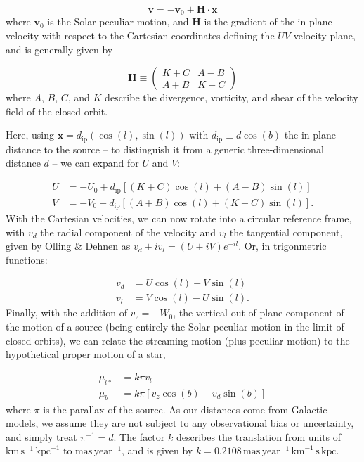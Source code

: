 \documentclass[fleqn,usenatbib]{mnras}
\begin{document}
\begin{equation}
    \bm{v} = -\bm{v}_0 + \bm{H} \cdot \bm{x}
\end{equation}
where $\bm{v}_0$ is the Solar peculiar motion, and $\bm{H}$ is the gradient of the in-plane velocity with respect to the Cartesian coordinates defining the $UV$ velocity plane, and is generally given by

\begin{equation}
    \bm{H} \equiv \left(\begin{matrix} K + C & A - B \\ A + B & K - C \end{matrix} \right)
\end{equation}
where $A$, $B$, $C$, and $K$ describe the divergence, vorticity, and shear of the velocity field of the closed orbit.

Here, using $\bm{x} = d_\mathrm{ip}\left(\cos(l), \sin(l)\right)$ with $d_\mathrm{ip} \equiv d \cos(b)$ the in-plane distance to the source -- to distinguish it from a generic three-dimensional distance $d$ -- we can expand for $U$ and $V$:

\begin{align}
    U &= -U_0 + d_\mathrm{ip} \left[(K + C)\cos(l) + (A - B)\sin(l)\right] \\
    V &= -V_0 + d_\mathrm{ip} \left[(A + B)\cos(l) + (K - C)\sin(l)\right].
\end{align}
With the Cartesian velocities, we can now rotate into a circular reference frame, with $v_d$ the radial component of the velocity and $v_l$ the tangential component, given by Olling \& Dehnen as $v_d + iv_l = (U + iV)e^{-il}$. Or, in trigonmetric functions:

\begin{align}
    v_d &= U\cos(l) + V\sin(l) \\
    v_l &= V\cos(l) - U\sin(l).
\end{align}
Finally, with the addition of $v_z = -W_0$, the vertical out-of-plane component of the motion of a source (being entirely the Solar peculiar motion in the limit of closed orbits), we can relate the streaming motion (plus peculiar motion) to the hypothetical proper motion of a star,

\begin{align}
    \mu_{l*} &= k \pi v_l \\
    \mu_b &= k \pi\left[v_z \cos(b) - v_d \sin(b)\right]
\end{align}
where $\pi$ is the parallax of the source. As our distances come from Galactic models, we assume they are not subject to any observational bias or uncertainty, and simply treat $\pi^{-1} = d$. The factor $k$ describes the translation from units of $\mathrm{km}\,\mathrm{s}^{-1}\,\mathrm{kpc}^{-1}$ to $\mathrm{mas}\,\mathrm{year}^{-1}$, and is given by $k = 0.2108\,\mathrm{mas}\,\mathrm{year}^{-1}\,\mathrm{km}^{-1}\,\mathrm{s}\,\mathrm{kpc}$.
\end{document}
